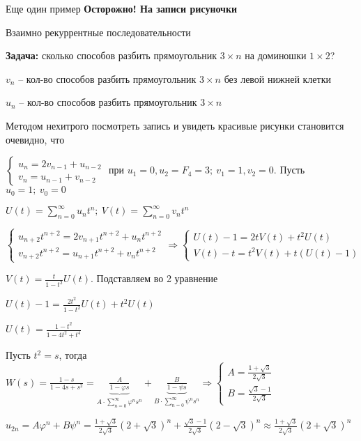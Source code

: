 \documentclass[12pt]{article}
\begin{document}
\begin{Example}{Еще один пример}
    \textbf{Осторожно! На записи рисуночки}

    Взаимно рекуррентные последовательности

    \textbf{Задача:} сколько способов разбить прямоугольник $3 \times n$ на доминошки $1 \times 2$?

    $v_n$ -- кол-во способов разбить прямоугольник $3 \times n$ без левой нижней клетки

    $u_n$ -- кол-во способов разбить прямоугольник $3 \times n$

    Методом нехитрого посмотреть запись и увидеть красивые рисунки становится очевидно, что 

    $\begin{cases}
        u_n = 2v_{n - 1} + u_{n - 2} \\
        v_n = u_{n - 1} + v_{n - 2}
    \end{cases}$ при $u_1 = 0, u_2 = F_4 = 3;\ v_1 = 1, v_2 = 0$. Пусть $u_0 = 1;\ v_0 = 0$

    $U(t) = \sum\limits_{n = 0}^\infty u_nt^n;\ V(t) = \sum\limits_{n = 0}^\infty v_nt^n$

    $\begin{cases}
        u_{n + 2}t^{n + 2} = 2v_{n + 1}t^{n + 2} + u_nt^{n + 2} \\
        v_{n + 2}t^{n + 2} = u_{n + 1}t^{n + 2} + v_nt^{n + 2}
    \end{cases} \Rightarrow \begin{cases}
        U(t) - 1 = 2tV(t) + t^2U(t) \\
        V(t) - t = t^2V(t) + t(U(t) - 1)
    \end{cases}$

    $V(t) = \frac{t}{1 - t^2}U(t)$. Подставляем во 2 уравнение

    $U(t) - 1 = \frac{2t^2}{1 - t^2}U(t) + t^2U(t)$

    $U(t) = \frac{1 - t^2}{1 - 4t^2 + t^4}$

    Пусть $t^2 = s$, тогда $W(s) = \frac{1 - s}{1 - 4s + s^2} = \underbrace{\frac{A}{1 - \varphi s}}_{A \cdot \sum\limits_{n = 0}^\infty \varphi^ns^n} + \underbrace{\frac{B}{1 - \psi s}}_{B \cdot \sum\limits_{n = 0}^\infty \psi^ns^n} \Rightarrow \begin{cases}
        A = \frac{1 + \sqrt{3}}{2\sqrt{3}} \\
        B = \frac{\sqrt{3} - 1}{2\sqrt{3}}
    \end{cases}$

    $u_{2n} = A \varphi^n + B \psi^n = \frac{1 + \sqrt{3}}{2\sqrt{3}}(2 + \sqrt{3})^n + \frac{\sqrt{3} - 1}{2\sqrt{3}}(2 - \sqrt{3})^n \approx \frac{1 + \sqrt{3}}{2\sqrt{3}}(2 + \sqrt{3})^n$
\end{Example}
\end{document}
